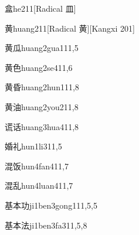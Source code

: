 \begin{verbete}{盒}{he2}{11}[Radical ⽫]
\end{verbete}

\begin{verbete}{黄}{huang2}{11}[Radical ⻩][Kangxi 201]
\end{verbete}

\begin{verbete}{黄瓜}{huang2gua1}{11,5}
\end{verbete}

\begin{verbete}{黄色}{huang2se4}{11,6}
\end{verbete}

\begin{verbete}{黄昏}{huang2hun1}{11,8}
\end{verbete}

\begin{verbete}{黄油}{huang2you2}{11,8}
\end{verbete}

\begin{verbete}{谎话}{huang3hua4}{11,8}
\end{verbete}

\begin{verbete}{婚礼}{hun1li3}{11,5}
\end{verbete}

\begin{verbete}{混饭}{hun4fan4}{11,7}
\end{verbete}

\begin{verbete}{混乱}{hun4luan4}{11,7}
\end{verbete}

\begin{verbete}{基本功}{ji1ben3gong1}{11,5,5}
\end{verbete}

\begin{verbete}{基本法}{ji1ben3fa3}{11,5,8}
\end{verbete}

